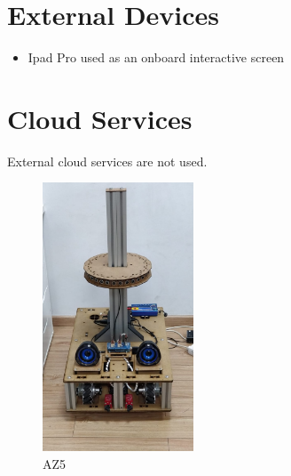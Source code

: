 % 
\section*{External Devices}
\begin{itemize}[nosep]
	\item Ipad Pro used as an onboard interactive screen
\end{itemize}


%
\section*{Cloud Services}
External cloud services are not used.

\setlength\intextsep{0pt}
\begin{figure}
	\centering
	\includegraphics[width=0.4\textwidth]{images/AZ5.jpeg}
	\caption{AZ5}
	\label{fig:wall-e}
\end{figure}
